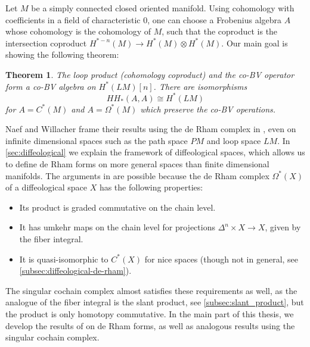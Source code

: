 \documentclass{scrartcl}
\theoremstyle{plain}
\newtheorem{theorem*}{Theorem}
\theoremstyle{definition}
\newcommand{\iso}{\cong}
\begin{document}
Let $M$ be a simply connected closed oriented manifold. Using cohomology with coefficients in a field of characteristic $0$, one can choose a Frobenius algebra $A$ whose cohomology is the cohomology of $M$, such that the coproduct is the intersection coproduct $H^{*-n}(M)\to H^{*}(M)\otimes H^*(M)$. Our main goal is showing the following theorem:
\begin{theorem*}
    The loop product (cohomology coproduct) and the co-BV operator form a co-BV algebra on $H^*(LM)[n]$. There are isomorphisms $$HH_*(A, A)\iso H^*(LM)$$ for $A=C^*(M)$ and $A=\Omega^*(M)$ which preserve the co-BV operations.
\end{theorem*}


Naef and Willacher frame their results using the de Rham complex in \cite{naef2019string}, even on infinite dimensional spaces such as the path space $PM$ and loop space $LM$. In \cref{sec:diffeological} we explain the framework of diffeological spaces, which allows us to define de Rham forms on more general spaces than finite dimensional manifolds. The arguments in \cite{naef2019string} are possible because the de Rham complex $\Omega^*(X)$ of a diffeological space $X$ has the following properties: 
\begin{itemize}
    \item Its product is graded commutative on the chain level.
    \item It has umkehr maps on the chain level for projections $\Delta^n \times X\to X$, given by the fiber integral. 
    \item It is quasi-isomorphic to $C^*(X)$ for nice spaces (though not in general, see \cref{subsec:diffeological-de-rham}). 
\end{itemize}
The singular cochain complex almost satisfies these requirements as well, as the analogue of the fiber integral is the slant product, see \cref{subsec:slant_product}, but the product is only homotopy commutative. 
In the main part of this thesis, we develop the results of \cite{naef2019string} on de Rham forms, as well as analogous results using the singular cochain complex. 
\end{document}
